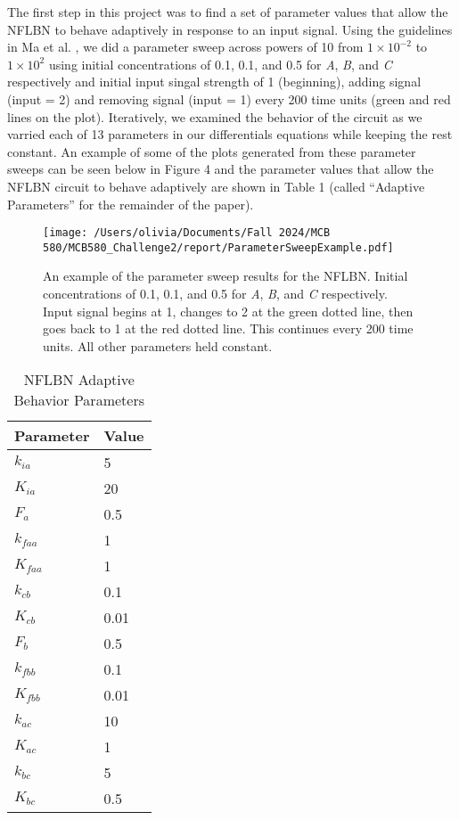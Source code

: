 \documentclass{article}
\begin{document}
The first step in this project was to find a set of parameter values that allow the NFLBN to behave adaptively in response to an input signal. Using the guidelines in Ma et al. \cite{challenge2paperD2L}, we did a parameter sweep across powers of 10 from $1 \times 10^{-2}$ to $1 \times 10^{2}$ using initial concentrations of 0.1, 0.1, and 0.5 for \textit{A}, \textit{B}, and \textit{C} respectively and initial input singal strength of 1 (beginning), adding signal (input = 2) and removing signal (input = 1) every 200 time units (green and red lines on the plot). Iteratively, we examined the behavior of the circuit as we varried each of 13 parameters in our differentials equations while keeping the rest constant. An example of some of the plots generated from these parameter sweeps can be seen below in Figure 4 and the parameter values that allow the NFLBN circuit to behave adaptively are shown in Table 1 (called ``Adaptive Parameters'' for the remainder of the paper). 

\begin{figure}[H]
    \centering
    \texttt{[image: /Users/olivia/Documents/Fall 2024/MCB 580/MCB580\_Challenge2/report/ParameterSweepExample.pdf]}
    \caption{An example of the parameter sweep results for the NFLBN. Initial concentrations of 0.1, 0.1, and 0.5 for \textit{A}, \textit{B}, and \textit{C} respectively. Input signal begins at 1, changes to 2 at the green dotted line, then goes back to 1 at the red dotted line. This continues every 200 time units. All other parameters held constant.}
    \label{fig:4}
\end{figure}

\begin{table}[h]
    \centering
    \caption{NFLBN Adaptive Behavior Parameters}
    \begin{tabular}{@{}ll@{}}
        \toprule
        Parameter & Value \\ 
        \midrule
        \(k_{ia}\) & 5 \\
        \(K_{ia}\) & 20 \\
        \(F_a\) & 0.5 \\
        \(k_{faa}\) & 1 \\
        \(K_{faa}\) & 1 \\
        \(k_{cb}\) & 0.1 \\
        \(K_{cb}\) & 0.01 \\
        \(F_b\) & 0.5 \\
        \(k_{fbb}\) & 0.1 \\
        \(K_{fbb}\) & 0.01 \\
        \(k_{ac}\) & 10 \\
        \(K_{ac}\) & 1 \\
        \(k_{bc}\) & 5 \\
        \(K_{bc}\) & 0.5 \\
        \bottomrule
    \end{tabular}
    \label{tab:parameters}
\end{table}
\end{document}
